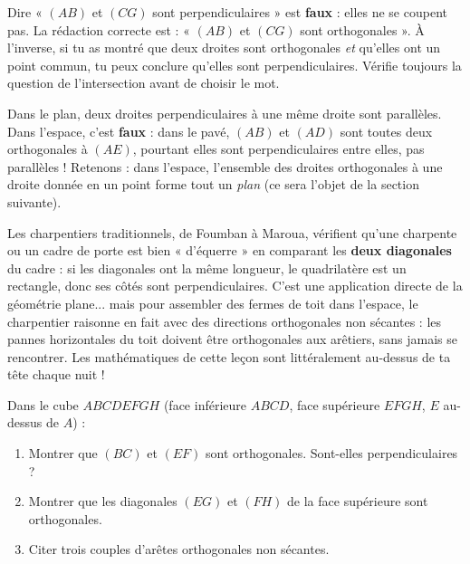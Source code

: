 \documentclass[11pt]{article}
\begin{document}
\begin{attention}
Dire « $(AB)$ et $(CG)$ sont perpendiculaires » est \textbf{faux} : elles ne se coupent pas. La rédaction correcte est : « $(AB)$ et $(CG)$ sont orthogonales ». À l'inverse, si tu as montré que deux droites sont orthogonales \emph{et} qu'elles ont un point commun, tu peux conclure qu'elles sont perpendiculaires. Vérifie toujours la question de l'intersection avant de choisir le mot.
\end{attention}

\begin{attention}
Dans le plan, deux droites perpendiculaires à une même droite sont parallèles. Dans l'espace, c'est \textbf{faux} : dans le pavé, $(AB)$ et $(AD)$ sont toutes deux orthogonales à $(AE)$, pourtant elles sont perpendiculaires entre elles, pas parallèles ! Retenons : dans l'espace, l'ensemble des droites orthogonales à une droite donnée en un point forme tout un \emph{plan} (ce sera l'objet de la section suivante).
\end{attention}

\begin{savaistu}
Les charpentiers traditionnels, de Foumban à Maroua, vérifient qu'une charpente ou un cadre de porte est bien « d'équerre » en comparant les \textbf{deux diagonales} du cadre : si les diagonales ont la même longueur, le quadrilatère est un rectangle, donc ses côtés sont perpendiculaires. C'est une application directe de la géométrie plane... mais pour assembler des fermes de toit dans l'espace, le charpentier raisonne en fait avec des directions orthogonales non sécantes : les pannes horizontales du toit doivent être orthogonales aux arêtiers, sans jamais se rencontrer. Les mathématiques de cette leçon sont littéralement au-dessus de ta tête chaque nuit !
\end{savaistu}

\begin{exercice}
Dans le cube $ABCDEFGH$ (face inférieure $ABCD$, face supérieure $EFGH$, $E$ au-dessus de $A$) :
\begin{enumerate}
\item Montrer que $(BC)$ et $(EF)$ sont orthogonales. Sont-elles perpendiculaires ?
\item Montrer que les diagonales $(EG)$ et $(FH)$ de la face supérieure sont orthogonales.
\item Citer trois couples d'arêtes orthogonales non sécantes.
\end{enumerate}
\end{exercice}
\end{document}
